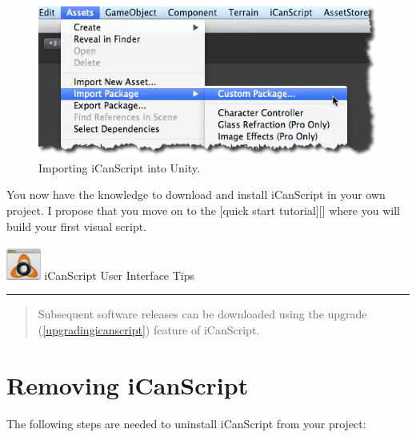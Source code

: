 \begin{figure}[htbp]
\centering
\includegraphics[keepaspectratio,width=\textwidth,height=0.75\textheight]{custom-import.png}
\caption{Importing iCanScript into Unity.}
\label{custom-import.png}
\end{figure}

You now have the knowledge to download and install iCanScript in your own project. I propose that you move on to the [quick start tutorial][] where you will build your first visual script.
\begin{tipbox}

\includegraphics[width=32pt,height=32pt]{icanscript-ui-tips_64x64x32.png} {\Large \color{black} iCanScript User Interface Tips }

\begin{center}\rule{\textwidth}{0.4pt}\end{center}

\begin{quote}

Subsequent software releases can be downloaded using the upgrade (\autoref{upgradingicanscript}) feature of iCanScript.
\end{quote}

\end{tipbox}



\chapter{Removing iCanScript}
\label{removingicanscript}

The following steps are needed to uninstall iCanScript from your project:

